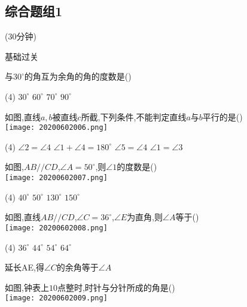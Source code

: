\documentclass[cn,blue,12pt]{elegantbook}
\renewcommand \tkt[1]{{\CJKunderline[hidden=true, skip=true, thickness=1pt]{#1}}}
\begin{document}
\subsection{综合题组1}%
(30分钟)
\begin{shiti}
\item 基础过关
  \begin{shiti}
  \item 与\(30 ^\circ\)的角互为余角的角的度数是(\tkt{B})\\
    \begin{tasks}(4)
      \task \(30 ^\circ\)
      \task \( 60^\circ \)
      \task \( 70^\circ \)
      \task \( 90 ^\circ \)
    \end{tasks}
  \item 如图,直线\(a,b\)被直线\(c\)所截,下列条件,不能判定直线\( a\)与\(b\)平行的是(\tkt{D})\\
\texttt{[image: 20200602006.png]}\\
    \begin{tasks}(4)
      \task \(\angle 2=\angle 4\)
      \task \(\angle 1+ \angle 4 =180^\circ\)
      \task \(\angle 5=\angle 4\)
      \task \(\angle 1=\angle 3\)
    \end{tasks}
  \item 如图,\(AB // CD\),\(\angle A =50^\circ \),则\(\angle 1\)的度数是(\tkt{C})\\
\texttt{[image: 20200602007.png]}\\
    \begin{tasks}(4)
      \task \( 40^\circ \)
      \task \( 50 ^\circ  \)
      \task \( 130 ^\circ \)
      \task \( 150 ^\circ \)
    \end{tasks}
  \item 如图,直线\(AB // CD \),\(\angle C =36^\circ \),\( \angle E\)为直角,则\(\angle A\)等于(\tkt{C})\\
\texttt{[image: 20200602008.png]}\\
    \begin{tasks}(4)
      \task \(36^\circ\)
      \task \(44^\circ\)
      \task \(54^\circ\)
      \task \(64^\circ\)
    \end{tasks}
\begin{solution}
        延长AE,得\(\angle C\)的余角等于\(\angle A\)
\end{solution}
  \item 如图,钟表上\(10\)点整时,时针与分针所成的角是(\tkt{B})\\
\texttt{[image: 20200602009.png]}\\

\end{shiti}
\end{shiti}
\end{document}
